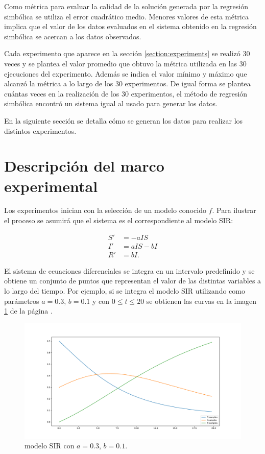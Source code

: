Como métrica para evaluar la calidad de la solución generada por la regresión simbólica se utiliza el error cuadrático medio. Menores valores de esta métrica implica que el valor de los datos evaluados en el sistema obtenido en la regresión simbólica se acercan a los datos observados.

Cada experimento que aparece en la sección \ref{section:experiments} se realizó 30 veces y se plantea el valor promedio que obtuvo la métrica utilizada en las 30 ejecuciones del experimento. Además se indica el valor mínimo y máximo que alcanzó la métrica a lo largo de los 30 experimentos. De igual forma se plantea cuántas veces en la realización de los 30 experimentos, el método de regresión simbólica encontró un sistema igual al usado para generar los datos.

En la siguiente sección se detalla cómo se generan los datos para realizar los distintos experimentos.

\section{Descripción del marco experimental}\label{section:experimental_frame}

Los experimentos inician con la selección de un modelo conocido $f$. Para ilustrar el proceso se asumirá que el sistema es el correspondiente al modelo SIR:

\begin{align*}
    S' & = - aIS    \\
    I' & = aIS - bI \\
    R' & = bI.
\end{align*}

El sistema de ecuaciones diferenciales se integra en un intervalo predefinido y se obtiene un conjunto de puntos que representan el valor de las distintas variables a lo largo del tiempo. Por ejemplo, si se integra el modelo SIR utilizando como parámetros $a = 0.3$, $b = 0.1$ y con $0 \leq t \leq 20$ se obtienen las curvas en la imagen \ref{fig:SIR} de la página \pageref{fig:SIR}.

\begin{figure}[h]
    \centering
    \includegraphics[width=\textwidth]{"figures/SIR.pdf"}
    \caption{modelo SIR con $a = 0.3$, $b = 0.1$.}
    \label{fig:SIR}
\end{figure}

